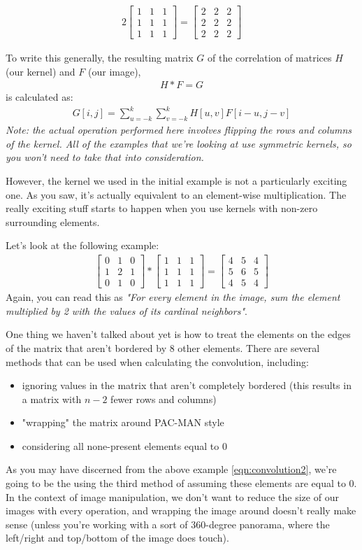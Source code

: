 \documentclass{tufte-handout}
\newcommand{\threebythree}[9]{\ensuremath{\begin{bmatrix} #1 & #2 & #3 \\ #4 & #5 & #6 \\ #7 & #8 & #9 \end{bmatrix}}}
\begin{document}
\begin{align}
    2 \threebythree{1}{1}{1}{1}{1}{1}{1}{1}{1} = \threebythree{2}{2}{2}{2}{2}{2}{2}{2}{2}
\end{align}

To write this generally, the resulting matrix $G$ of the correlation of matrices $H$ (our kernel) and $F$ (our image),
\begin{align}
    H * F = G
\end{align}
is calculated as:
\begin{align}
    G[i, j] = \sum_{u=-k}^{k} \sum_{v=-k}^{k} H[u, v] F[i - u, j - v]
\end{align}
\emph{Note: the actual operation performed here involves flipping the rows and columns of the kernel. All of the examples that we're looking at use symmetric kernels, so you won't need to take that into consideration.}

However, the kernel we used in the initial example is not a particularly exciting one. As you saw, it's actually equivalent to an element-wise multiplication. The really exciting stuff starts to happen when you use kernels with non-zero surrounding elements.

Let's look at the following example:
\begin{align}\label{eqn:convolution2}
    \threebythree{0}{1}{0}{1}{2}{1}{0}{1}{0} * \threebythree{1}{1}{1}{1}{1}{1}{1}{1}{1} = 
    \threebythree{4}{5}{4}{5}{6}{5}{4}{5}{4}
\end{align}
Again, you can read this as \emph{"For every element in the image, sum the element multiplied by 2 with the values of its cardinal neighbors"}.

One thing we haven't talked about yet is how to treat the elements on the edges of the matrix that aren't bordered by 8 other elements. There are several methods that can be used when calculating the convolution, including:
\begin{itemize}
    \item ignoring values in the matrix that aren't completely bordered (this results in a matrix with $n-2$ fewer rows and columns)
    \item "wrapping" the matrix around PAC-MAN style
    \item considering all none-present elements equal to 0
\end{itemize}
As you may have discerned from the above example \eqref{eqn:convolution2}, we're going to be the using the third method of assuming these elements are equal to 0. In the context of image manipulation, we don't want to reduce the size of our images with every operation, and wrapping the image around doesn't really make sense (unless you're working with a sort of 360-degree panorama, where the left/right and top/bottom of the image does touch).
\end{document}
